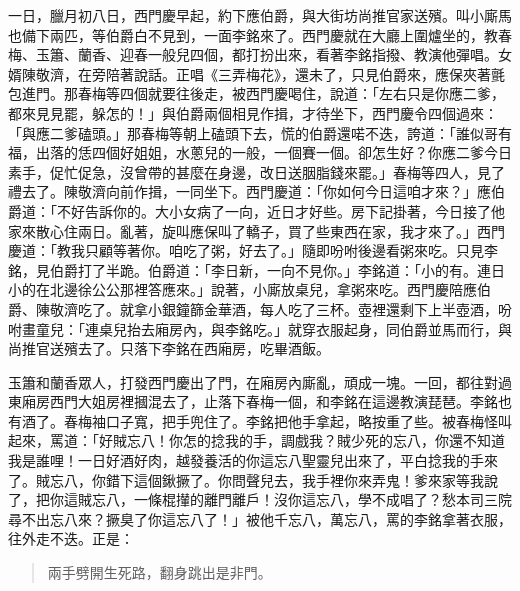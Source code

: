 一日，臘月初八日，西門慶早起，約下應伯爵，與大街坊尚推官家送殯。叫小廝馬也備下兩匹，等伯爵白不見到，一面李銘來了。西門慶就在大廳上圍爐坐的，教春梅、玉簫、蘭香、迎春一般兒四個，都打扮出來，看著李銘指撥、教演他彈唱。女婿陳敬濟，在旁陪著說話。正唱《三弄梅花》，還未了，只見伯爵來，應保夾著氈包進門。那春梅等四個就要往後走，被西門慶喝住，說道：「左右只是你應二爹，都來見見罷，躲怎的！」與伯爵兩個相見作揖，才待坐下，西門慶令四個過來：「與應二爹磕頭。」那春梅等朝上磕頭下去，慌的伯爵還喏不迭，誇道：「誰似哥有福，出落的恁四個好姐姐，水蔥兒的一般，一個賽一個。卻怎生好？你應二爹今日素手，促忙促急，沒曾帶的甚麼在身邊，改日送胭脂錢來罷。」春梅等四人，見了禮去了。陳敬濟向前作揖，一同坐下。西門慶道：「你如何今日這咱才來？」應伯爵道：「不好告訴你的。大小女病了一向，近日才好些。房下記掛著，今日接了他家來散心住兩日。亂著，旋叫應保叫了轎子，買了些東西在家，我才來了。」西門慶道：「教我只顧等著你。咱吃了粥，好去了。」隨即吩咐後邊看粥來吃。只見李銘，見伯爵打了半跪。伯爵道：「李日新，一向不見你。」李銘道：「小的有。連日小的在北邊徐公公那裡答應來。」說著，小廝放桌兒，拿粥來吃。西門慶陪應伯爵、陳敬濟吃了。就拿小銀鐘篩金華酒，每人吃了三杯。壺裡還剩下上半壺酒，吩咐畫童兒：「連桌兒抬去廂房內，與李銘吃。」就穿衣服起身，同伯爵並馬而行，與尚推官送殯去了。只落下李銘在西廂房，吃畢酒飯。

玉簫和蘭香眾人，打發西門慶出了門，在廂房內廝亂，頑成一塊。一回，都往對過東廂房西門大姐房裡摑混去了，止落下春梅一個，和李銘在這邊教演琵琶。李銘也有酒了。春梅袖口子寬，把手兜住了。李銘把他手拿起，略按重了些。被春梅怪叫起來，罵道：「好賊忘八！你怎的捻我的手，調戲我？賊少死的忘八，你還不知道我是誰哩！一日好酒好肉，越發養活的你這忘八聖靈兒出來了，平白捻我的手來了。賊忘八，你錯下這個鍬撅了。你問聲兒去，我手裡你來弄鬼！爹來家等我說了，把你這賊忘八，一條棍攆的離門離戶！沒你這忘八，學不成唱了？愁本司三院尋不出忘八來？撅臭了你這忘八了！」被他千忘八，萬忘八，罵的李銘拿著衣服，往外走不迭。正是：
\begin{quote}
兩手劈開生死路，翻身跳出是非門。
\end{quote}


